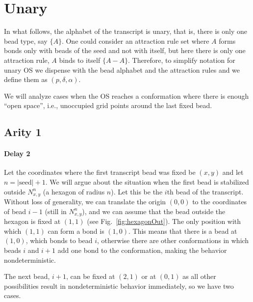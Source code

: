 \documentclass[]{llncs}
\begin{document}
\section{Unary}
In what follows, the alphabet of the transcript is unary, that is, there is only one bead type, say $\{A\}$. One could consider an attraction rule set where $A$ forms bonds only with beads of the seed and not with itself, but here there is only one attraction rule, $A$ binds to itself $\{A-A\}$.
Therefore, to simplify notation for unary OS we dispense with the bead alphabet and the attraction rules and we define them as $(p, \delta, \alpha)$.

We will analyze cases when the OS reaches a conformation where there is enough ``open space'', i.e., unoccupied grid points around the last fixed bead.


\subsection{Arity 1}


\paragraph{Delay 2}
Let the coordinates where the first transcript bead was fixed be $(x,y)$ and let $n=|\mathrm{seed}|+1$. We will argue about the situation when the first bead is stabilized outside $N_{x,y}^n$ (a hexagon of radius $n$). Let this be the $i$th bead of the transcript. Without loss of generality, we can translate the origin $(0,0)$ to the coordinates of bead $i-1$ (still in $N_{x,y}^n$), and we can assume that the bead outside the hexagon is fixed at $(1,1)$ (see Fig.~\ref{fig:hexagonOut}). The only position with which $(1,1)$ can form a bond is $(1,0)$. This means that there is a bead at $(1,0)$, which bonds to bead $i$, otherwise there are other conformations in which beads $i$ and $i+1$ add one bond to the conformation, making the behavior nondeterministic.

The next bead, $i+1$, can be fixed at $(2,1)$ or at $(0,1)$ as all other possibilities result in nondeterministic behavior immediately, so we have two cases.
\end{document}
